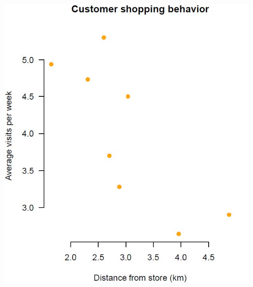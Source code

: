 \begin{minipage}[t]{0.4\textwidth}
\includegraphics[width=\textwidth]{Files/Images/covariance.jpg}
\end{minipage}%
